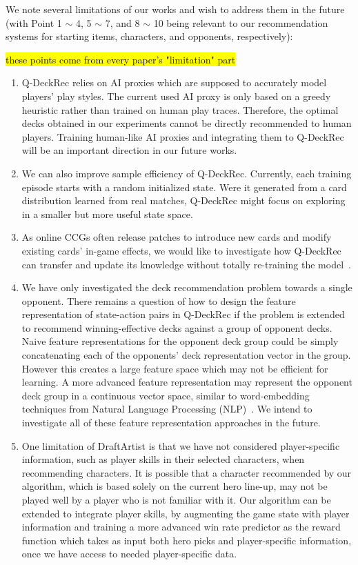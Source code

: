 We note several limitations of our works and wish to address them in the future (with Point 1 $\sim$ 4, 5 $\sim$ 7, and 8 $\sim$ 10 being relevant to our recommendation systems for starting items, characters, and opponents, respectively):

\hl {these points come from every paper's "limitation" part}
\begin{enumerate}
\item Q-DeckRec relies on AI proxies which are supposed to accurately model players' play styles. The current used AI proxy is only based on a greedy heuristic rather than trained on human play traces. Therefore, the optimal decks obtained in our experiments cannot be directly recommended to human players. Training human-like AI proxies and integrating them to Q-DeckRec will be an important direction in our future works. 

\item We can also improve sample efficiency of Q-DeckRec. Currently, each training episode starts with a random initialized state. Were it generated from a card distribution learned from real matches, Q-DeckRec might focus on exploring in a smaller but more useful state space. 

\item As online CCGs often release patches to introduce new cards and modify existing cards' in-game effects, we would like to investigate how Q-DeckRec can transfer and update its knowledge without totally re-training the model~\cite{taylor2009transfer}.

\item We have only investigated the deck recommendation problem towards a single opponent. There remains a question of how to design the feature representation of state-action pairs in Q-DeckRec if the problem is extended to recommend winning-effective decks against a group of opponent decks. Naive feature representations for the opponent deck group could be simply concatenating each of the opponents' deck representation vector in the group. However this creates a large feature space which may not be efficient for learning. A more advanced feature representation may represent the opponent deck group in a continuous vector space, similar to word-embedding techniques from Natural Language Processing (NLP)~\cite{mikolov2013distributed}. We intend to investigate all of these feature representation approaches in the future.

\item One limitation of DraftArtist is that we have not considered player-specific information, such as player skills in their selected characters, when recommending characters. It is possible that a character recommended by our algorithm, which is based solely on the current hero line-up, may not be played well by a player who is not familiar with it. Our algorithm can be extended to integrate player skills, by augmenting the game state with player information and training a more advanced win rate predictor as the reward function which takes as input both hero picks and player-specific information, once we have access to needed player-specific data.


\end{enumerate}
